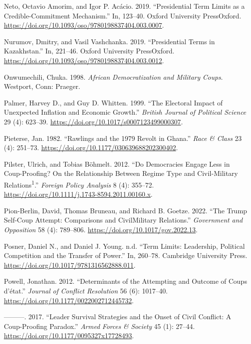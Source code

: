 \documentclass[
  12pt,
]{report}
\newlength{\cslhangindent}
\newenvironment{CSLReferences}[2] %
 {\begin{list}{}{%
  \setlength{\itemindent}{0pt}
  \setlength{\leftmargin}{0pt}
  \setlength{\parsep}{0pt}
  \ifodd #1
   \setlength{\leftmargin}{\cslhangindent}
   \setlength{\itemindent}{-1\cslhangindent}
  \fi
  \setlength{\itemsep}{#2\baselineskip}}}
 {\end{list}}
\begin{document}
\begin{CSLReferences}{1}{0}
Neto, Octavio Amorim, and Igor P. Acácio. 2019. {``Presidential Term
Limits as a Credible-Commitment Mechanism.''} In, 123--40. Oxford
University PressOxford.
\url{https://doi.org/10.1093/oso/9780198837404.003.0007}.

Nurumov, Dmitry, and Vasil Vashchanka. 2019. {``Presidential Terms in
Kazakhstan.''} In, 221--46. Oxford University PressOxford.
\url{https://doi.org/10.1093/oso/9780198837404.003.0012}.

Onwumechili, Chuka. 1998. \emph{African Democratization and Military
Coups}. Westport, Conn: Praeger.

Palmer, Harvey D., and Guy D. Whitten. 1999. {``The Electoral Impact of
Unexpected Inflation and Economic Growth.''} \emph{British Journal of
Political Science} 29 (4): 623--39.
\url{https://doi.org/10.1017/s0007123499000307}.

Pieterse, Jan. 1982. {``Rawlings and the 1979 Revolt in Ghana.''}
\emph{Race \& Class} 23 (4): 251--73.
\url{https://doi.org/10.1177/030639688202300402}.

Pilster, Ulrich, and Tobias Böhmelt. 2012. {``Do Democracies Engage Less
in Coup-Proofing? On the Relationship Between Regime Type and
Civil-Military Relations{\textsuperscript{1}}.''} \emph{Foreign Policy
Analysis} 8 (4): 355--72.
\url{https://doi.org/10.1111/j.1743-8594.2011.00160.x}.

Pion-Berlin, David, Thomas Bruneau, and Richard B. Goetze. 2022. {``The
Trump Self-Coup Attempt: Comparisons and Civil{\textendash}Military
Relations.''} \emph{Government and Opposition} 58 (4): 789--806.
\url{https://doi.org/10.1017/gov.2022.13}.

Posner, Daniel N., and Daniel J. Young. n.d. {``Term Limits: Leadership,
Political Competition and the Transfer of Power.''} In, 260--78.
Cambridge University Press.
\url{https://doi.org/10.1017/9781316562888.011}.

Powell, Jonathan. 2012. {``Determinants of the Attempting and Outcome of
Coups d{'}état.''} \emph{Journal of Conflict Resolution} 56 (6):
1017--40. \url{https://doi.org/10.1177/0022002712445732}.

---------. 2017. {``Leader Survival Strategies and the Onset of Civil
Conflict: A Coup-Proofing Paradox.''} \emph{Armed Forces \& Society} 45
(1): 27--44. \url{https://doi.org/10.1177/0095327x17728493}.


\end{CSLReferences}
\end{document}
